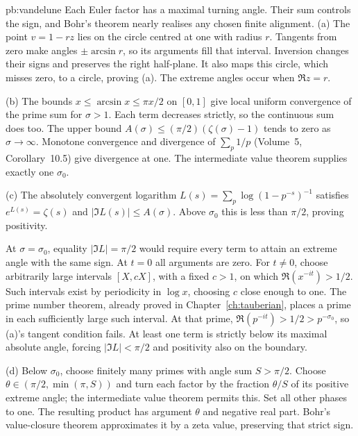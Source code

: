\begin{solution}{pb:vandelune}
\idea Each Euler factor has a maximal turning angle. Their sum controls the sign, and Bohr's theorem nearly realises any chosen finite alignment.
\writeup (a) The point $v=1-rz$ lies on the circle centred at one with radius $r$. Tangents from zero make angles $\pm\arcsin r$, so its arguments fill that interval. Inversion changes their signs and preserves the right half-plane. It also maps this circle, which misses zero, to a circle, proving (a). The extreme angles occur when $\Re z=r$.

(b) The bounds $x\le\arcsin x\le\pi x/2$ on $[0,1]$ give local uniform convergence of the prime sum for $\sigma>1$. Each term decreases strictly, so the continuous sum does too. The upper bound $A(\sigma)\le(\pi/2)(\zeta(\sigma)-1)$ tends to zero as $\sigma\to\infty$. Monotone convergence and divergence of $\sum_p1/p$ (Volume~5, Corollary~10.5) give divergence at one. The intermediate value theorem supplies exactly one $\sigma_0$.

(c) The absolutely convergent logarithm $L(s)=\sum_p\log(1-p^{-s})^{-1}$ satisfies $e^{L(s)}=\zeta(s)$ and $|\Im L(s)|\le A(\sigma)$. Above $\sigma_0$ this is less than $\pi/2$, proving positivity.

At $\sigma=\sigma_0$, equality $|\Im L|=\pi/2$ would require every term to attain an extreme angle with the same sign. At $t=0$ all arguments are zero. For $t\ne0$, choose arbitrarily large intervals $[X,cX]$, with a fixed $c>1$, on which $\Re(x^{-it})>1/2$. Such intervals exist by periodicity in $\log x$, choosing $c$ close enough to one. The prime number theorem, already proved in Chapter~\ref{ch:tauberian}, places a prime in each sufficiently large such interval. At that prime, $\Re(p^{-it})>1/2>p^{-\sigma_0}$, so (a)'s tangent condition fails. At least one term is strictly below its maximal absolute angle, forcing $|\Im L|<\pi/2$ and positivity also on the boundary.

(d) Below $\sigma_0$, choose finitely many primes with angle sum $S>\pi/2$. Choose $\theta\in(\pi/2,\min(\pi,S))$ and turn each factor by the fraction $\theta/S$ of its positive extreme angle; the intermediate value theorem permits this. Set all other phases to one. The resulting product has argument $\theta$ and negative real part. Bohr's value-closure theorem approximates it by a zeta value, preserving that strict sign.


\end{solution}
